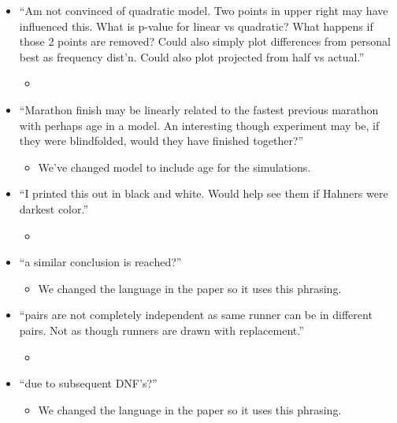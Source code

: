 \documentclass[12pt]{article}
\begin{document}
\begin{itemize}
\item ``Am not convinced of quadratic model. Two points in upper right
  may have influenced this. What is p-value for linear vs quadratic?
  What happens if those 2 points are removed? Could also simply plot
  differences from personal best as frequency dist'n. Could also plot
  projected from half vs actual.''
  \begin{itemize}
  \item
  \end{itemize}

\item ``Marathon finish may be linearly related to the fastest
  previous marathon with perhaps age in a model. An interesting though
  experiment may be, if they were blindfolded, would they have
  finished together?''
  \begin{itemize}
  \item We've changed model to include age for the simulations. 
  \end{itemize}


\item ``I printed this out in black and white. Would help see them if
  Hahners were darkest color.''
   \begin{itemize}
  \item
  \end{itemize}

\item ``a similar conclusion is reached?''
  \begin{itemize}
  \item We changed the language in the paper so it uses this phrasing.
  \end{itemize}
  

\item ``pairs are not completely independent as same runner can be in
  different pairs. Not as though runners are drawn with replacement.''
   \begin{itemize}
  \item
  \end{itemize}


\item ``due to subsequent DNF's?''
   \begin{itemize}
  \item We changed the language in the paper so it uses this phrasing.
  \end{itemize}
  


\end{itemize}
\end{document}
